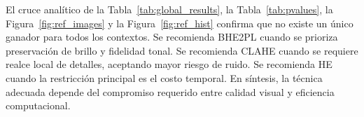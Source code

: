 \documentclass[journal,10pt,twocolumn]{IEEEtran}
\begin{document}
El cruce analítico de la Tabla~\ref{tab:global_results}, la Tabla~\ref{tab:pvalues}, la Figura~\ref{fig:ref_images} y la Figura~\ref{fig:ref_hist} confirma que no existe un único ganador para todos los contextos. Se recomienda BHE2PL cuando se prioriza preservación de brillo y fidelidad tonal. Se recomienda CLAHE cuando se requiere realce local de detalles, aceptando mayor riesgo de ruido. Se recomienda HE cuando la restricción principal es el costo temporal. En síntesis, la técnica adecuada depende del compromiso requerido entre calidad visual y eficiencia computacional.



\end{document}
